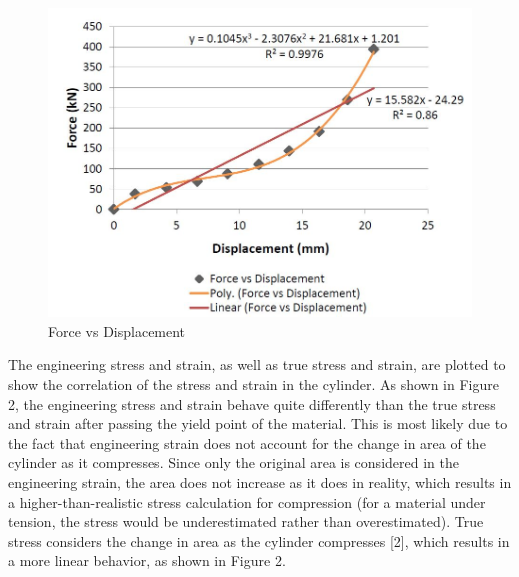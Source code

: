 \documentclass[12pt]{article}
\begin{document}
\begin{figure}[h!]  
  \centering
    \includegraphics[width=\linewidth]{force_vs_displacement.JPG}
    \caption{Force vs Displacement}
\end{figure}

\newpage

The engineering stress and strain, as well as true stress and strain, are plotted to show the correlation of the stress and strain in the cylinder. As shown in Figure 2, the engineering stress and strain behave quite differently than the true stress and strain after passing the yield point of the material. This is most likely due to the fact that engineering strain does not account for the change in area of the cylinder as it compresses. Since only the original area is considered in the engineering strain, the area does not increase as it does in reality, which results in a higher-than-realistic stress calculation for compression (for a material under tension, the stress would be underestimated rather than overestimated). True stress considers the change in area as the cylinder compresses [2], which results in a more linear behavior, as shown in Figure 2.
\bigskip
\bigskip
\bigskip
\bigskip
\end{document}
